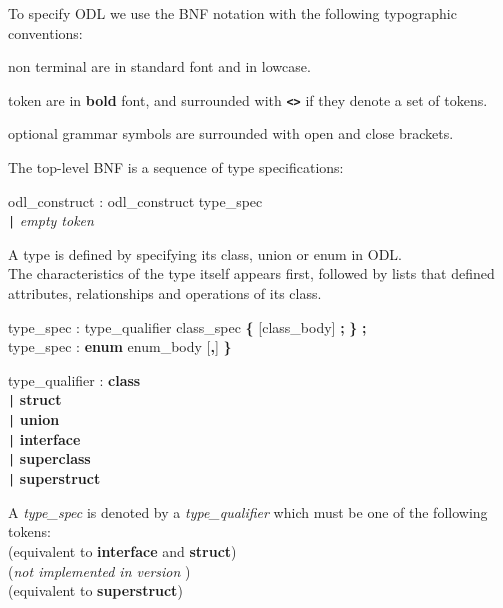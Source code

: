 
To specify ODL we use the BNF notation with the following typographic
conventions:
\begin{list}{-}{{\itemsep 0mm}} %
\item non terminal are in standard font and in lowcase.
\item token are in {\bf bold} font, and surrounded with {\bf \texttt{<>}} if they
denote a set of tokens.
\item optional grammar symbols are surrounded with open and close brackets.
\end{list}

The top-level BNF is a sequence of type specifications:
\begin{tabbing}
\grindent
odl\_construct \> : odl\_construct type\_spec\\
\> \texttt{|} \emph{empty token}
\end{tabbing}


A type is defined by specifying its class, union or enum in ODL.\\
The characteristics of the type itself appears first, followed by
lists that defined attributes, relationships and operations of its
class.
\begin{tabbing}
\grindent
type\_spec \> : type\_qualifier class\_spec {\bf \{} [class\_body] {\bf ;} {\bf \}} {\bf ;}\\
type\_spec \> : {\bf enum}  enum\_body [{\bf ,}] {\bf \}}
\end{tabbing}


\begin{tabbing}
\grindent
type\_qualifier \> : {\bf class}\\
\> \texttt{|} {\bf struct}\\
\> \texttt{|} {\bf union}\\
\> \texttt{|} {\bf interface}\\
\> \texttt{|} {\bf superclass}\\
\> \texttt{|} {\bf superstruct}
\end{tabbing}
A \emph{type\_spec} is denoted by a \emph{type\_qualifier} which must be one
of the following tokens:\\
 (equivalent to {\bf interface} and {\bf struct})\\
 (\emph{not implemented in version \eyedbversion})\\
 (equivalent to {\bf superstruct})

